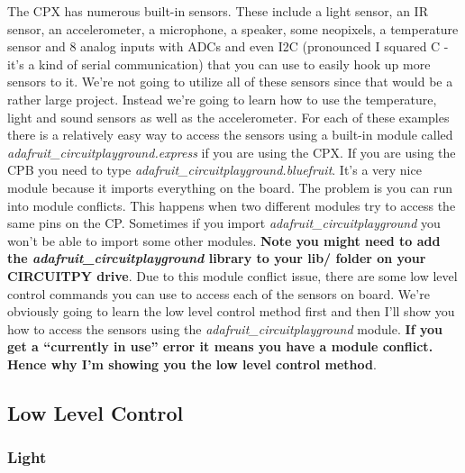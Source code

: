 The CPX has numerous built-in sensors. These include a light sensor,
an IR sensor, an accelerometer, a microphone, a speaker, some
neopixels, a temperature sensor and 8 analog inputs with ADCs and even
I2C (pronounced I squared C - it’s a kind of serial communication)
that you can use to easily hook up more sensors to it. We're not going
to utilize all of these sensors since that would be a rather large
project. Instead we’re going to learn how to use the temperature,
light and sound sensors as well as the accelerometer. For each of
these examples there is a relatively easy way to access the sensors
using a built-in module called {\it
adafruit\_circuitplayground.express} if you are using the CPX. If you
are using the CPB you need to type {\it
adafruit\_circuitplayground.bluefruit}. It’s a very nice module
because it imports everything on the board. The problem is you can run
into module conflicts. This happens when two different modules try to
access the same pins on the CP. Sometimes if you import {\it
adafruit\_circuitplayground} you won’t be able to import some other
modules. {\bf Note you might need to add the {\it
adafruit\_circuitplayground} library to your lib/ folder on your
CIRCUITPY drive}. Due to this module conflict issue, there are some
low level control commands you can use to access each of the sensors
on board. We're obviously going to learn the low level control method
first and then I’ll show you how to access the sensors using the {\it
adafruit\_circuitplayground} module. {\bf If you get a “currently in
use” error it means you have a module conflict. Hence why I’m showing
you the low level control method}. 

\subsection{Low Level Control}

\subsubsection{Light}

